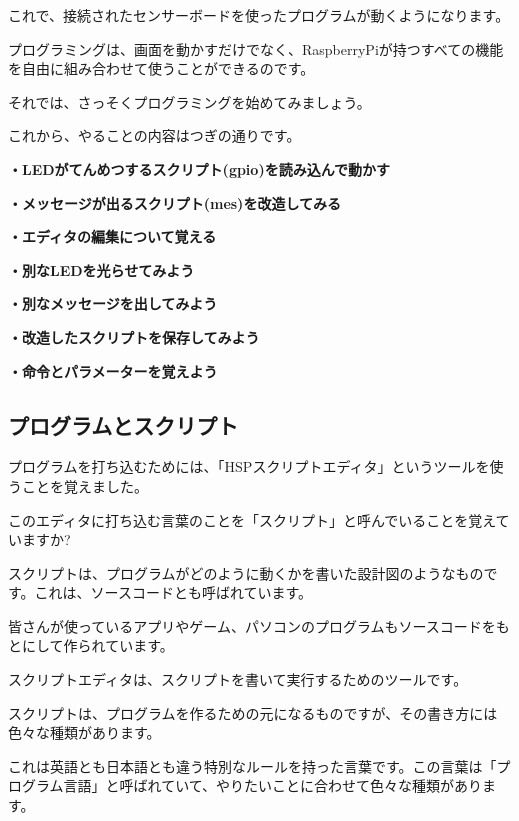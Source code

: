 \documentclass[a4paper,12pt]{jarticle}
\begin{document}
\bigskip
\bigskip
\bigskip

これで、接続されたセンサーボードを使ったプログラムが動くようになります。

プログラミングは、画面を動かすだけでなく、RaspberryPiが持つすべての機能を自由に組み合わせて使うことができるのです。

\bigskip

それでは、さっそくプログラミングを始めてみましょう。

これから、やることの内容はつぎの通りです。


\bigskip

{\bfseries
・LEDがてんめつするスクリプト(gpio)を読み込んで動かす}

{\bfseries
・メッセージが出るスクリプト(mes)を改造してみる}

{\bfseries
・エディタの編集について覚える}

{\bfseries
・別なLEDを光らせてみよう}

{\bfseries
・別なメッセージを出してみよう}

{\bfseries
・改造したスクリプトを保存してみよう}

{\bfseries
・命令とパラメーターを覚えよう}


\clearpage
\subsection{プログラムとスクリプト}
\bigskip
\bigskip

プログラムを打ち込むためには、「HSPスクリプトエディタ」というツールを使うことを覚えました。

このエディタに打ち込む言葉のことを「スクリプト」と呼んでいることを覚えていますか?

スクリプトは、プログラムがどのように動くかを書いた設計図のようなものです。これは、ソースコードとも呼ばれています。

皆さんが使っているアプリやゲーム、パソコンのプログラムもソースコードをもとにして作られています。

スクリプトエディタは、スクリプトを書いて実行するためのツールです。


\bigskip


\bigskip

スクリプトは、プログラムを作るための元になるものですが、その書き方には色々な種類があります。

これは英語とも日本語とも違う特別なルールを持った言葉です。この言葉は「プログラム言語」と呼ばれていて、やりたいことに合わせて色々な種類があります。

\bigskip
\bigskip
\end{document}
